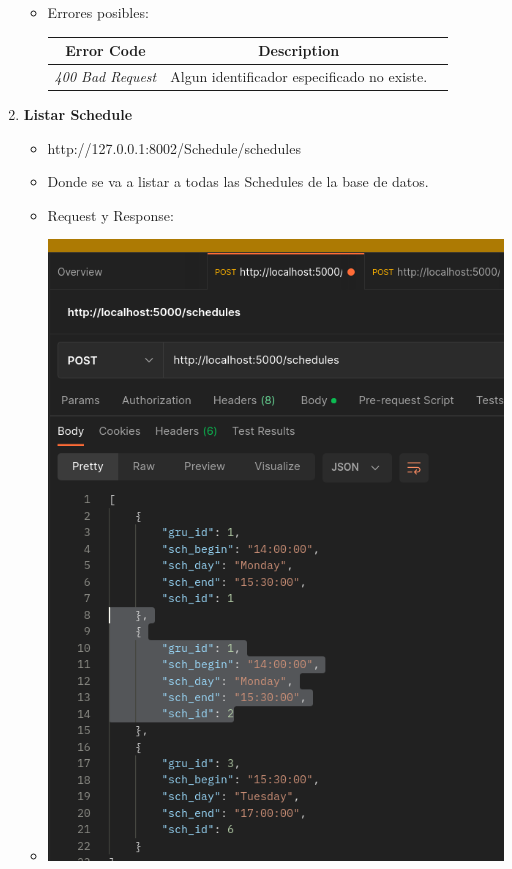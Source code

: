 \documentclass{article}
\begin{document}
\begin{enumerate}
\begin{itemize}
        \item Errores posibles: \begin{table}[H] \centering \begin{tabular}{|c|c|l|}
        \hline \textbf{Error Code} & \textbf{Description} \\ \hline \textit{400
        Bad Request} & Algun identificador especificado no existe. \\ \hline
        \end{tabular} \end{table}
    \end{itemize}

    \item \textbf{Listar Schedule}
    \begin{itemize}
        \item http://127.0.0.1:8002/Schedule/schedules
        \item Donde se va a listar a todas las Schedules de la base de
        datos.
        \item Request y Response:
        \item \includegraphics[scale=.5]{assets/schedule/schedules.png}

\end{itemize}
\end{enumerate}
\end{document}
